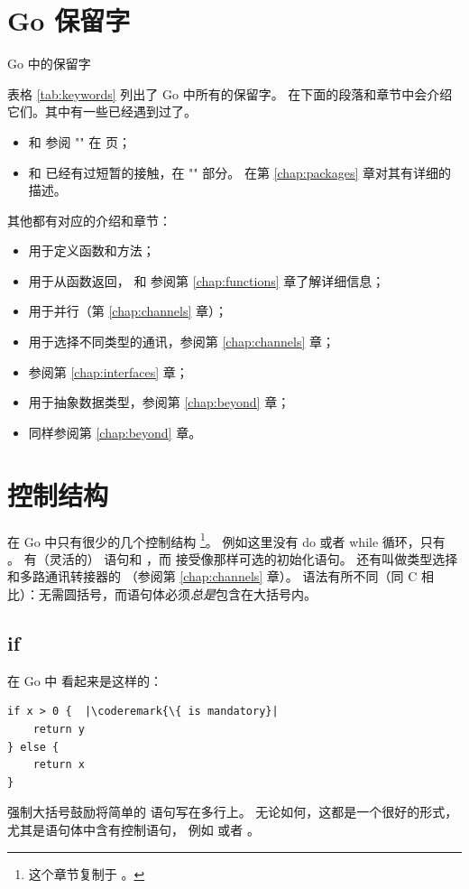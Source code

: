 \section{Go 保留字}
\begin{table}[H]
\begin{center}
\caption{Go 中的保留字}
\label{tab:keywords}

\end{center}
\end{table}
表格 \ref{tab:keywords} 列出了 Go 中所有的保留字。
在下面的段落和章节中会介绍它们。其中有一些已经遇到过了。
\begin{itemize}
\item {} 和  参阅 "" 在 \pageref{sec:vars} 页；
\item {} 和  已经有过短暂的接触，在 "" 部分。 
在第 \ref{chap:packages} 章对其有详细的描述。
\end{itemize}
其他都有对应的介绍和章节：
\begin{itemize}
\item {} 用于定义函数和方法；
\item {} 用于从函数返回， 和 
参阅第 \ref{chap:functions} 章了解详细信息；
\item {} 用于并行（第 \ref{chap:channels} 章）；
\item {} 用于选择不同类型的通讯，参阅第 \ref{chap:channels} 章；
\item {} 参阅第 \ref{chap:interfaces} 章；
\item {} 用于抽象数据类型，参阅第 \ref{chap:beyond} 章；
\item {} 同样参阅第 \ref{chap:beyond} 章。
\end{itemize}

\section{控制结构}
在 Go 中只有很少的几个控制结构
\footnote{这个章节复制于 \cite{effective_go}。}。
例如这里没有 do 或者 while 循环，只有 。
有（灵活的） 语句和 ，而
 接受像那样可选的初始化语句。
还有叫做类型选择和多路通讯转接器的  （参阅第 \ref{chap:channels} 章）。
语法有所不同（同 C 相比）：无需圆括号，而语句体必须\emph{总是}包含在大括号内。

\subsection{if}
在 Go 中  看起来是这样的：
\begin{lstlisting}
if x > 0 {	|\coderemark{\{ is mandatory}|
    return y
} else {
    return x
}
\end{lstlisting}
强制大括号鼓励将简单的  语句写在多行上。
无论如何，这都是一个很好的形式，尤其是语句体中含有控制语句，
例如  或者 。

